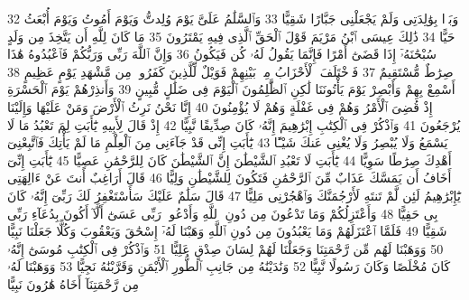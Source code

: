 {\tiny\colorbox{cl_aya}{32}} وَبَرًّۢا بِوَٰلِدَتِى وَلَمْ يَجْعَلْنِى جَبَّارًا شَقِيًّا
{\tiny\colorbox{cl_aya}{33}} وَٱلسَّلَٰمُ عَلَىَّ يَوْمَ وُلِدتُّ وَيَوْمَ أَمُوتُ وَيَوْمَ أُبْعَثُ حَيًّا
{\tiny\colorbox{cl_aya}{34}} ذَٰلِكَ عِيسَى ٱبْنُ مَرْيَمَ قَوْلَ ٱلْحَقِّ ٱلَّذِى فِيهِ يَمْتَرُونَ
{\tiny\colorbox{cl_aya}{35}} مَا كَانَ لِلَّهِ أَن يَتَّخِذَ مِن وَلَدٍ سُبْحَٰنَهُۥٓ إِذَا قَضَىٰٓ أَمْرًا فَإِنَّمَا يَقُولُ لَهُۥ كُن فَيَكُونُ
{\tiny\colorbox{cl_aya}{36}} وَإِنَّ ٱللَّهَ رَبِّى وَرَبُّكُمْ فَٱعْبُدُوهُ هَٰذَا صِرَٰطٌ مُّسْتَقِيمٌ
{\tiny\colorbox{cl_aya}{37}} فَٱخْتَلَفَ ٱلْأَحْزَابُ مِنۢ بَيْنِهِمْ فَوَيْلٌ لِّلَّذِينَ كَفَرُوا۟ مِن مَّشْهَدِ يَوْمٍ عَظِيمٍ
{\tiny\colorbox{cl_aya}{38}} أَسْمِعْ بِهِمْ وَأَبْصِرْ يَوْمَ يَأْتُونَنَا لَٰكِنِ ٱلظَّٰلِمُونَ ٱلْيَوْمَ فِى ضَلَٰلٍ مُّبِينٍ
{\tiny\colorbox{cl_aya}{39}} وَأَنذِرْهُمْ يَوْمَ ٱلْحَسْرَةِ إِذْ قُضِىَ ٱلْأَمْرُ وَهُمْ فِى غَفْلَةٍ وَهُمْ لَا يُؤْمِنُونَ
{\tiny\colorbox{cl_aya}{40}} إِنَّا نَحْنُ نَرِثُ ٱلْأَرْضَ وَمَنْ عَلَيْهَا وَإِلَيْنَا يُرْجَعُونَ
{\tiny\colorbox{cl_aya}{41}} وَٱذْكُرْ فِى ٱلْكِتَٰبِ إِبْرَٰهِيمَ إِنَّهُۥ كَانَ صِدِّيقًا نَّبِيًّا
{\tiny\colorbox{cl_aya}{42}} إِذْ قَالَ لِأَبِيهِ يَٰٓأَبَتِ لِمَ تَعْبُدُ مَا لَا يَسْمَعُ وَلَا يُبْصِرُ وَلَا يُغْنِى عَنكَ شَيْـًٔا
{\tiny\colorbox{cl_aya}{43}} يَٰٓأَبَتِ إِنِّى قَدْ جَآءَنِى مِنَ ٱلْعِلْمِ مَا لَمْ يَأْتِكَ فَٱتَّبِعْنِىٓ أَهْدِكَ صِرَٰطًا سَوِيًّا
{\tiny\colorbox{cl_aya}{44}} يَٰٓأَبَتِ لَا تَعْبُدِ ٱلشَّيْطَٰنَ إِنَّ ٱلشَّيْطَٰنَ كَانَ لِلرَّحْمَٰنِ عَصِيًّا
{\tiny\colorbox{cl_aya}{45}} يَٰٓأَبَتِ إِنِّىٓ أَخَافُ أَن يَمَسَّكَ عَذَابٌ مِّنَ ٱلرَّحْمَٰنِ فَتَكُونَ لِلشَّيْطَٰنِ وَلِيًّا
{\tiny\colorbox{cl_aya}{46}} قَالَ أَرَاغِبٌ أَنتَ عَنْ ءَالِهَتِى يَٰٓإِبْرَٰهِيمُ لَئِن لَّمْ تَنتَهِ لَأَرْجُمَنَّكَ وَٱهْجُرْنِى مَلِيًّا
{\tiny\colorbox{cl_aya}{47}} قَالَ سَلَٰمٌ عَلَيْكَ سَأَسْتَغْفِرُ لَكَ رَبِّىٓ إِنَّهُۥ كَانَ بِى حَفِيًّا
{\tiny\colorbox{cl_aya}{48}} وَأَعْتَزِلُكُمْ وَمَا تَدْعُونَ مِن دُونِ ٱللَّهِ وَأَدْعُوا۟ رَبِّى عَسَىٰٓ أَلَّآ أَكُونَ بِدُعَآءِ رَبِّى شَقِيًّا
{\tiny\colorbox{cl_aya}{49}} فَلَمَّا ٱعْتَزَلَهُمْ وَمَا يَعْبُدُونَ مِن دُونِ ٱللَّهِ وَهَبْنَا لَهُۥٓ إِسْحَٰقَ وَيَعْقُوبَ وَكُلًّا جَعَلْنَا نَبِيًّا
{\tiny\colorbox{cl_aya}{50}} وَوَهَبْنَا لَهُم مِّن رَّحْمَتِنَا وَجَعَلْنَا لَهُمْ لِسَانَ صِدْقٍ عَلِيًّا
{\tiny\colorbox{cl_aya}{51}} وَٱذْكُرْ فِى ٱلْكِتَٰبِ مُوسَىٰٓ إِنَّهُۥ كَانَ مُخْلَصًا وَكَانَ رَسُولًا نَّبِيًّا
{\tiny\colorbox{cl_aya}{52}} وَنَٰدَيْنَٰهُ مِن جَانِبِ ٱلطُّورِ ٱلْأَيْمَنِ وَقَرَّبْنَٰهُ نَجِيًّا
{\tiny\colorbox{cl_aya}{53}} وَوَهَبْنَا لَهُۥ مِن رَّحْمَتِنَآ أَخَاهُ هَٰرُونَ نَبِيًّا
